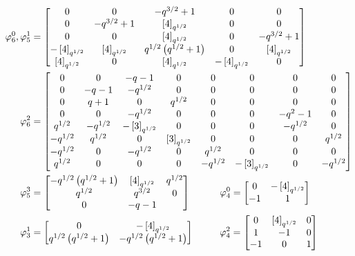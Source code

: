 \documentclass{amsart}
\begin{document}
\begin{figure}[h]
\iffalse
\def\tho{\Phi_3(q^{1/2})}
\def\tht{\brk{3}_{q^{1/2}}}
\def\to{q^{1/2}\brk{2}_{q^{1/2}}}
Define the following coefficients:
\begin{align*}
  \tho &:= q^{3/2} + 1\\
  \tht &:= q^{3/2} + q + q^{1/2} + 1\\
  \to &:= q + q^{1/2}
\end{align*}
\fi

\def\tho{q^{3/2} + 1}
\def\tht{\brk{4}_{q^{1/2}}}
\def\to{q^{1/2}\prn{q^{1/2} + 1}}
\begin{align*}
  \varphi_6^0, \varphi_5^1 &= \begin{bmatrix}
    0 & 0 & -\tho & 0 & 0\\
    0 & -\tho & \tht & 0 & 0\\
    0 & 0 & \tht & 0 & -\tho\\
    -\tht & \tht & \to & 0 & \tht\\
    \tht & 0 & \tht & -\tht & 0
  \end{bmatrix}\\
  \varphi_6^2 &= \begin{bmatrix}
    0 & 0 & - q - 1 & 0 & 0 & 0 & 0 & 0\\
    0 & -q - 1 & -q^{1/2} & 0 & 0 & 0 & 0 & 0\\
    0 & q + 1 & 0 & q^{1/2} & 0 & 0 & 0 & 0\\
    0 & 0 & -q^{1/2} & 0 & 0 & 0 & -q^2 - 1 & 0\\
    q^{1/2} & -q^{1/2} & -\brk{3}_{q^{1/2}} & 0 & 0 & 0 & -q^{1/2} & 0\\
   -q^{1/2} & q^{1/2} & 0 & \brk{3}_{q^{1/2}} &0 & 0 & 0 & q^{1/2}\\
   -q^{1/2} & 0 & -q^{1/2} & 0 & q^{1/2} & 0 & 0 & 0\\
    q^{1/2} & 0 & 0 & 0 & -q^{1/2} & -\brk{3}_{q^{1/2}} & 0 & -q^{1/2}
  \end{bmatrix}\\
  \varphi_5^3 &= \begin{bmatrix}
    -\to & \tht & q^{1/2}\\
    q^{1/2} & q^{3/2} & 0\\
    0 & -q - 1
  \end{bmatrix}  \hspace{30pt} 
  \varphi_4^0 = \begin{bmatrix}
    0 & -\tht\\
    -1 & 1
  \end{bmatrix}\\
  \varphi_3^1 &= \begin{bmatrix}
    0 & -\tht\\
    \to & -\to
  \end{bmatrix} \hspace{27pt}
  \varphi_4^2 = \begin{bmatrix}
    0 & \tht & 0\\
    1 & -1 & 0\\
    -1 & 0 & 1
  \end{bmatrix}
\end{align*}


\end{figure}
\end{document}
